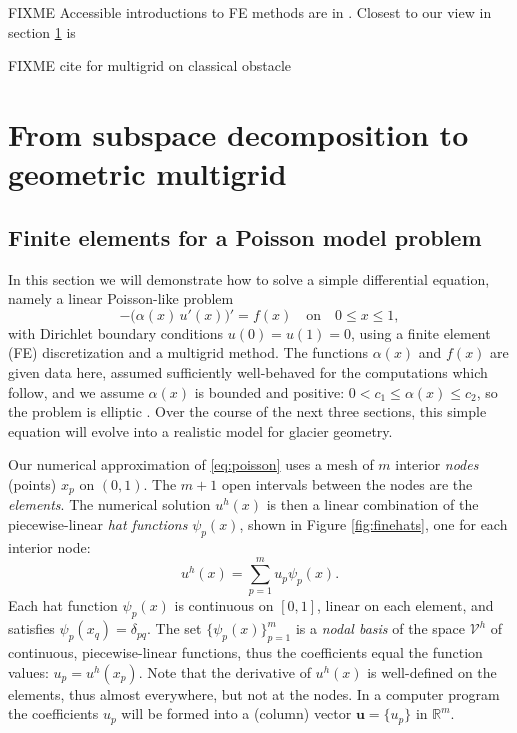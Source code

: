 \documentclass[letterpaper,final,12pt,reqno]{amsart}
\theoremstyle{claim}
\newcommand{\RR}{\mathbb{R}}
\newcommand{\bu}{\mathbf{u}}
\numberwithin{equation}{section}
\numberwithin{figure}{section}
\numberwithin{table}{section}
\numberwithin{theorem}{section}
\begin{document}
FIXME Accessible introductions to FE methods are in \cite{Bueler2021,Elmanetal2014,Johnson2009}.  Closest to our view in section \ref{sec:subspace} is \cite[Chapter V]{Braess2007}

FIXME cite for multigrid on classical obstacle \cite{BrandtCryer1983,Bueler2021,GraeserKornhuber2009}


\section{From subspace decomposition to geometric multigrid} \label{sec:subspace}

\subsection*{Finite elements for a Poisson model problem}  In this section we will demonstrate how to solve a simple differential equation, namely a linear Poisson-like problem
\begin{equation}
- \big(\alpha(x)\,u'(x)\big)' = f(x) \quad \text{on} \quad 0 \le x \le 1, \label{eq:poisson}
\end{equation}
with Dirichlet boundary conditions $u(0)=u(1)=0$, using a finite element (FE) discretization and a multigrid method.  The functions $\alpha(x)$ and $f(x)$ are given data here, assumed sufficiently well-behaved for the computations which follow, and we assume $\alpha(x)$ is bounded and positive: $0 < c_1 \le \alpha(x) \le c_2$, so the problem is elliptic \cite{Evans2010}.  Over the course of the next three sections, this simple equation will evolve into a realistic model for glacier geometry.

Our numerical approximation of \eqref{eq:poisson} uses a mesh of $m$ interior \emph{nodes} (points) $x_p$ on $(0,1)$.  The $m+1$ open intervals between the nodes are the \emph{elements}.  The numerical solution $u^h(x)$ is then a linear combination of the piecewise-linear \emph{hat functions} $\psi_p(x)$, shown in Figure \ref{fig:finehats}, one for each interior node:
\begin{equation}
u^h(x) = \sum_{p=1}^m u_p \psi_p(x). \label{eq:trialsolution}
\end{equation}
Each hat function $\psi_p(x)$ is continuous on $[0,1]$, linear on each element, and satisfies $\psi_p(x_q) = \delta_{pq}$.  The set $\{\psi_p(x)\}_{p=1}^m$ is a \emph{nodal basis} of the space $\mathcal{V}^h$ of continuous, piecewise-linear functions, thus the coefficients equal the function values: $u_p=u^h(x_p)$.  Note that the derivative of $u^h(x)$ is well-defined on the elements, thus almost everywhere, but not at the nodes.  In a computer program the coefficients $u_p$ will be formed into a (column) vector $\bu=\{u_p\}$ in $\RR^m$.
\end{document}

